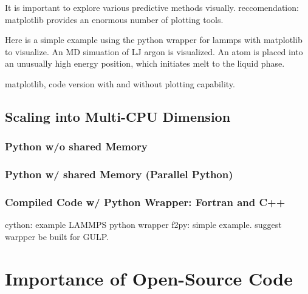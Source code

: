 \documentclass[letterpaper,12pt,amsmath,amssymb]{article}
\begin{document}
It is important to explore various predictive methods visually.  
reccomendation: matplotlib provides an enormous number of plotting 
tools.

Here is a simple example using the python wrapper for lammps 
with matplotlib to visualize. An MD simuation of LJ argon 
is visualized. An atom is placed into an unusually high energy 
position, which initiates melt to the liquid phase. 

matplotlib, code version with and without plotting capability.

\subsection{Scaling into Multi-CPU Dimension}

\subsubsection{Python w/o shared Memory}

\subsubsection{Python w/ shared Memory (Parallel Python)}

\subsubsection{Compiled Code w/ Python Wrapper: Fortran and C++}

cython: example LAMMPS python wrapper
f2py: simple example. suggest warpper be built for GULP.

\section{Importance of Open-Source Code}
\end{document}
